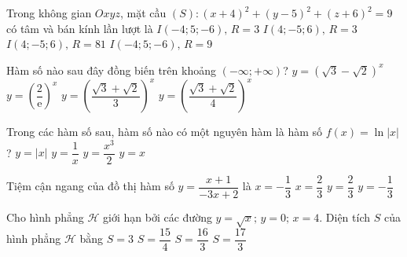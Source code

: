 \begin{ex}%
	Trong không gian $Oxyz$, mặt cầu $(S)\colon(x+4)^2+(y-5)^2+(z+6)^2=9$ có tâm và bán kính lần lượt là
	\choice
	{\True $I(-4;5;-6),\,R=3$}
	{$I(4;-5;6),\,R=3$}
	{$I(4;-5;6),\,R=81$}
	{$I(-4;5;-6),\,R=9$}
\end{ex}

\begin{ex}%
	Hàm số nào sau đây đồng biến trên khoảng $(-\infty;+\infty)$?
	\choice
	{$y=\left(\sqrt{3}-\sqrt{2}\right)^x$}
	{$y=\left(\dfrac{2}{\text{e}}\right)^x$}
	{\True $y=\left(\dfrac{\sqrt{3}+\sqrt{2}}{3}\right)^x$}
	{$y=\left(\dfrac{\sqrt{3}+\sqrt{2}}{4}\right)^x$}
\end{ex}

\begin{ex}%
	Trong các hàm số sau, hàm số nào có một nguyên hàm là hàm số $f(x)=\ln \left|x\right|$?
	\choice
	{$y=\left|x\right|$}
	{\True $y=\dfrac{1}{x}$}
	{$y=\dfrac{x^{3}}{2}$}
	{$y=x$}
\end{ex}

\begin{ex}%
	Tiệm cận ngang của đồ thị hàm số $y=\dfrac{x+1}{-3x+2}$ là
	\choice
	{$x=-\dfrac{1}{3}$}
	{$x=\dfrac{2}{3}$}
	{$y=\dfrac{2}{3}$}
	{\True $y=-\dfrac{1}{3}$}
\end{ex}

\begin{ex}%
	Cho hình phẳng $\mathscr{H}$ giới hạn bởi các đường $y=\sqrt{x};\,y=0;\,x=4$. Diện tích $S$ của hình phẳng $\mathscr{H}$ bằng
	\choice
	{$S=3$}
	{$S=\dfrac{15}{4}$}
	{\True $S=\dfrac{16}{3}$}
	{$S=\dfrac{17}{3}$}
\end{ex}

